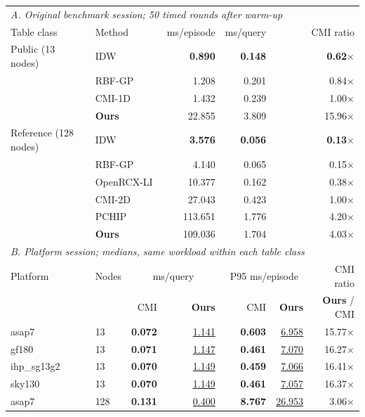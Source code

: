 \scriptsize
\setlength{\tabcolsep}{3pt}
\begin{tabular*}{\linewidth}{@{\extracolsep{\fill}}llrrrrr@{}}\toprule
\multicolumn{7}{l}{\textit{A. Original benchmark session; 50 timed rounds after warm-up}} \\
Table class & \multicolumn{2}{l}{Method} & ms/episode & ms/query & \multicolumn{2}{r}{CMI ratio} \\
\midrule
Public (13 nodes) & \multicolumn{2}{l}{IDW} & \textbf{0.890} & \textbf{0.148} & \multicolumn{2}{r}{\textbf{0.62}$\times$} \\
 & \multicolumn{2}{l}{RBF-GP} & 1.208 & 0.201 & \multicolumn{2}{r}{0.84$\times$} \\
 & \multicolumn{2}{l}{CMI-1D} & 1.432 & 0.239 & \multicolumn{2}{r}{1.00$\times$} \\
 & \multicolumn{2}{l}{\textbf{Ours}} & 22.855 & 3.809 & \multicolumn{2}{r}{15.96$\times$} \\
Reference (128 nodes) & \multicolumn{2}{l}{IDW} & \textbf{3.576} & \textbf{0.056} & \multicolumn{2}{r}{\textbf{0.13}$\times$} \\
 & \multicolumn{2}{l}{RBF-GP} & 4.140 & 0.065 & \multicolumn{2}{r}{0.15$\times$} \\
 & \multicolumn{2}{l}{OpenRCX-LI} & 10.377 & 0.162 & \multicolumn{2}{r}{0.38$\times$} \\
 & \multicolumn{2}{l}{CMI-2D} & 27.043 & 0.423 & \multicolumn{2}{r}{1.00$\times$} \\
 & \multicolumn{2}{l}{PCHIP} & 113.651 & 1.776 & \multicolumn{2}{r}{4.20$\times$} \\
 & \multicolumn{2}{l}{\textbf{Ours}} & 109.036 & 1.704 & \multicolumn{2}{r}{4.03$\times$} \\
\midrule
\multicolumn{7}{l}{\textit{B. Platform session; medians, same workload within each table class}} \\
Platform & Nodes & \multicolumn{2}{c}{ms/query} & \multicolumn{2}{c}{P95 ms/episode} & CMI ratio \\
 &  & CMI & \textbf{Ours} & CMI & \textbf{Ours} & \textbf{Ours} / CMI \\
\midrule
asap7 & 13 & \textbf{0.072} & \underline{1.141} & \textbf{0.603} & \underline{6.958} & 15.77$\times$ \\
gf180 & 13 & \textbf{0.071} & \underline{1.147} & \textbf{0.461} & \underline{7.070} & 16.27$\times$ \\
ihp\_sg13g2 & 13 & \textbf{0.070} & \underline{1.149} & \textbf{0.459} & \underline{7.066} & 16.41$\times$ \\
sky130 & 13 & \textbf{0.070} & \underline{1.149} & \textbf{0.461} & \underline{7.057} & 16.37$\times$ \\
asap7 & 128 & \textbf{0.131} & \underline{0.400} & \textbf{8.767} & \underline{26.953} & 3.06$\times$ \\
\bottomrule\end{tabular*}
